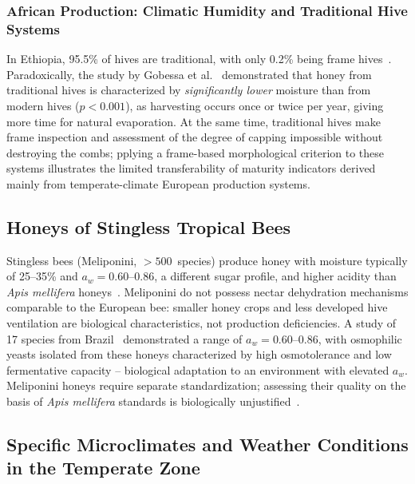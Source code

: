 \subsubsection{African Production: Climatic Humidity and Traditional Hive Systems}

In Ethiopia, 95.5\% of hives are traditional, with only 0.2\%
being frame hives~\cite{ethaau2007}. Paradoxically, the study
by Gobessa et al.~\cite{sciendo2012} demonstrated that honey
from traditional hives is characterized by \emph{significantly
lower} moisture than from modern hives ($p < 0.001$), as
harvesting occurs once or twice per year, giving more time
for natural evaporation. At the same time, traditional hives
make frame inspection and assessment of the degree of capping
impossible without destroying the combs; pplying a frame-based morphological criterion to these systems illustrates the limited transferability of maturity indicators derived mainly from temperate-climate European production systems\cite{tadele2025}.

\subsection{Honeys of Stingless Tropical Bees}

Stingless bees (Meliponini, $>500$~species) produce honey with
moisture typically of 25--35\% and $a_w = 0.60$--$0.86$,
a different sugar profile, and higher acidity than
\textit{Apis mellifera} honeys~\cite{stinglessyeastbrazil2021,stinglesswjava2024}.
Meliponini do not possess nectar dehydration mechanisms
comparable to the European bee: smaller honey crops and less
developed hive ventilation are biological characteristics,
not production deficiencies. A study of 17 species
from Brazil~\cite{stinglessyeastbrazil2021} demonstrated a range
of $a_w = 0.60$--$0.86$, with osmophilic yeasts isolated
from these honeys characterized by high osmotolerance and low
fermentative capacity -- biological adaptation to an environment
with elevated $a_w$. Meliponini honeys require separate
standardization; assessing their quality on the basis of
\textit{Apis mellifera} standards is biologically
unjustified~\cite{stinglessyeastbrazil2021,stinglesswjava2024}.

\subsection{Specific Microclimates and Weather Conditions in the Temperate Zone}

